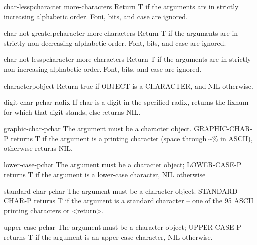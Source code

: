 \documentclass[10pt,english]{book}
\begin{document}
\begin{function}{char-lessp}{character \rest more-characters}
  Return T if the arguments are in strictly increasing alphabetic order.
   Font, bits, and case are ignored.
\end{function}

\begin{function}{char-not-greaterp}{character \rest more-characters}
  Return T if the arguments are in strictly non-decreasing alphabetic order.
   Font, bits, and case are ignored.
\end{function}

\begin{function}{char-not-lessp}{character \rest more-characters}
  Return T if the arguments are in strictly non-increasing alphabetic order.
   Font, bits, and case are ignored.
\end{function}

\begin{function}{characterp}{object}
  Return true if OBJECT is a CHARACTER, and NIL otherwise.
\end{function}

\begin{function}{digit-char-p}{char \op radix}
  If char is a digit in the specified radix, returns the fixnum for
  which that digit stands, else returns NIL.
\end{function}

\begin{function}{graphic-char-p}{char}
  The argument must be a character object. GRAPHIC-CHAR-P returns T if the
  argument is a printing character (space through \~{}\% in ASCII), otherwise
  returns NIL.
\end{function}

\begin{function}{lower-case-p}{char}
  The argument must be a character object; LOWER-CASE-P returns T if the
   argument is a lower-case character, NIL otherwise.
\end{function}

\begin{function}{standard-char-p}{char}
  The argument must be a character object. STANDARD-CHAR-P returns T if the
   argument is a standard character -- one of the 95 ASCII printing characters
   or <return>.
\end{function}

\begin{function}{upper-case-p}{char}
  The argument must be a character object; UPPER-CASE-P returns T if the
   argument is an upper-case character, NIL otherwise.
\end{function}
\end{document}
